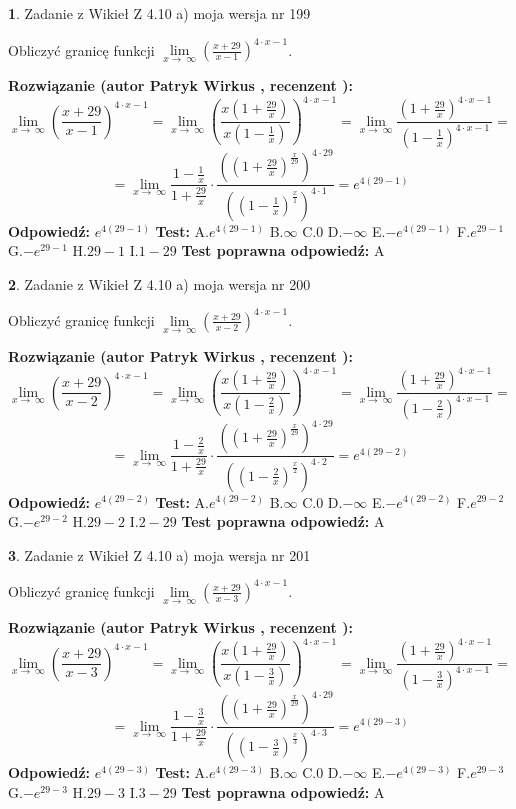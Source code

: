 \documentclass[12pt, a4paper]{article}
\theoremstyle{definition} %
\newtheorem{zad}{}
\newcommand{\zadStart}[1]{\begin{zad}#1\newline}
\newcommand{\zadStop}{\end{zad}}
\newcommand{\rozwStart}[2]{\noindent \textbf{Rozwiązanie (autor #1 , recenzent #2): }\newline}
\newcommand{\rozwStop}{\newline}
\newcommand{\odpStart}{\noindent \textbf{Odpowiedź:}\newline}
\newcommand{\odpStop}{\newline}
\newcommand{\testStart}{\noindent \textbf{Test:}\newline}
\newcommand{\testStop}{\newline}
\newcommand{\kluczStart}{\noindent \textbf{Test poprawna odpowiedź:}\newline}
\newcommand{\kluczStop}{\newline}
\begin{document}
\zadStart{Zadanie z Wikieł Z 4.10 a) moja wersja nr 199}


Obliczyć granicę funkcji  $\lim\limits_{x\to\ \infty}(\frac{x+29}{x-1})^{4\cdot x-1}$.
\zadStop
\rozwStart{Patryk Wirkus}{}
$$\lim\limits_{x\to\ \infty}(\frac{x+29}{x-1})^{4\cdot x-1} = \lim\limits_{x\to\ \infty}(\frac{x(1+\frac{29}{x})}{x(1-\frac{1}{x})})^{4\cdot x-1}=\lim\limits_{x\to\ \infty}\frac{(1+\frac{29}{x})^{4\cdot x-1}}{(1-\frac{1}{x})^{4\cdot x-1}}=$$
$$=\lim\limits_{x\to\ \infty}\frac{1-\frac{1}{x}}{1+\frac{29}{x}}\cdot\frac{((1+\frac{29}{x})^{\frac{x}{29}})^{4\cdot29}}{((1-\frac{1}{x})^{\frac{x}{1}})^{4\cdot1}}=e^{4(29-1)}$$
\rozwStop
\odpStart
$e^{4(29-1)}$
\odpStop
\testStart
A.$e^{4(29-1)}$ B.$\infty$ C.$0$ D.$-\infty$ E.$-e^{4(29-1)}$
F.$e^{29-1}$ G.$-e^{29-1}$
H.$29-1$
I.$1-29$
\testStop
\kluczStart
A
\kluczStop



\zadStart{Zadanie z Wikieł Z 4.10 a) moja wersja nr 200}


Obliczyć granicę funkcji  $\lim\limits_{x\to\ \infty}(\frac{x+29}{x-2})^{4\cdot x-1}$.
\zadStop
\rozwStart{Patryk Wirkus}{}
$$\lim\limits_{x\to\ \infty}(\frac{x+29}{x-2})^{4\cdot x-1} = \lim\limits_{x\to\ \infty}(\frac{x(1+\frac{29}{x})}{x(1-\frac{2}{x})})^{4\cdot x-1}=\lim\limits_{x\to\ \infty}\frac{(1+\frac{29}{x})^{4\cdot x-1}}{(1-\frac{2}{x})^{4\cdot x-1}}=$$
$$=\lim\limits_{x\to\ \infty}\frac{1-\frac{2}{x}}{1+\frac{29}{x}}\cdot\frac{((1+\frac{29}{x})^{\frac{x}{29}})^{4\cdot29}}{((1-\frac{2}{x})^{\frac{x}{2}})^{4\cdot2}}=e^{4(29-2)}$$
\rozwStop
\odpStart
$e^{4(29-2)}$
\odpStop
\testStart
A.$e^{4(29-2)}$ B.$\infty$ C.$0$ D.$-\infty$ E.$-e^{4(29-2)}$
F.$e^{29-2}$ G.$-e^{29-2}$
H.$29-2$
I.$2-29$
\testStop
\kluczStart
A
\kluczStop



\zadStart{Zadanie z Wikieł Z 4.10 a) moja wersja nr 201}


Obliczyć granicę funkcji  $\lim\limits_{x\to\ \infty}(\frac{x+29}{x-3})^{4\cdot x-1}$.
\zadStop
\rozwStart{Patryk Wirkus}{}
$$\lim\limits_{x\to\ \infty}(\frac{x+29}{x-3})^{4\cdot x-1} = \lim\limits_{x\to\ \infty}(\frac{x(1+\frac{29}{x})}{x(1-\frac{3}{x})})^{4\cdot x-1}=\lim\limits_{x\to\ \infty}\frac{(1+\frac{29}{x})^{4\cdot x-1}}{(1-\frac{3}{x})^{4\cdot x-1}}=$$
$$=\lim\limits_{x\to\ \infty}\frac{1-\frac{3}{x}}{1+\frac{29}{x}}\cdot\frac{((1+\frac{29}{x})^{\frac{x}{29}})^{4\cdot29}}{((1-\frac{3}{x})^{\frac{x}{3}})^{4\cdot3}}=e^{4(29-3)}$$
\rozwStop
\odpStart
$e^{4(29-3)}$
\odpStop
\testStart
A.$e^{4(29-3)}$ B.$\infty$ C.$0$ D.$-\infty$ E.$-e^{4(29-3)}$
F.$e^{29-3}$ G.$-e^{29-3}$
H.$29-3$
I.$3-29$
\testStop
\kluczStart
A
\kluczStop
\end{document}
